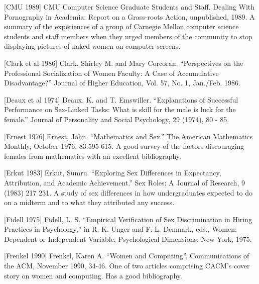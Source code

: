 {\parindent=0pt
\parskip=10pt


[CMU 1989]          CMU Computer Science Graduate Students and Staff. Dealing With Pornography in Academia: Report on a Grass-roots Action, unpublished, 1989. A summary of the experiences of a group of
                    Carnegie Mellon computer science students and staff members when they urged
                    members of the community to stop displaying pictures of naked women on computer screens.

[Clark et al 1986]  Clark, Shirley M. and Mary Corcoran.
                    ``Perspectives on the Professional Socialization of Women Faculty: A Case
                    of Accumulative Disadvantage?'' Journal of Higher Education, Vol. 57, No. 1,
                    Jan./Feb. 1986.


[Deaux et al 1974]  Deaux, K. and T. Emswiller. ``Explanations of Successful Performance on
                    Sex-Linked Tasks: What is skill for the
                    male is luck for the female.'' Journal of
                    Personality and Social Psychology, 29
                    (1974), 80 - 85.


[Ernest 1976]       Ernest, John. ``Mathematics and Sex.''
                    The American Mathematics Monthly,
                    October 1976, 83:595-615. A good survey of the factors discouraging females
                    from mathematics with an excellent bibliography.

[Erkut 1983]        Erkut, Sumru. ``Exploring Sex Differences in Expectancy, Attribution, and
                    Academic Achievement.'' Sex Roles: A
                    Journal of Research, 9 (1983) 217 231. A study of sex differences in how undergraduates expected to do on a midterm
                    and to what they attributed any success.


[Fidell 1975]       Fidell, L. S. ``Empirical Verification of
                    Sex Discrimination in Hiring Practices
                    in Psychology,'' in R. K. Unger and
                    F. L. Denmark, eds., Women: Dependent or Independent Variable, Psychological Dimensions: New York, 1975.



[Frenkel 1990]      Frenkel, Karen A. ``Women and Computing''. Communications of the ACM,
                    November 1990, 34-46. One of two articles comprising CACM's cover story on
                    women and computing. Has a good bibliography.




}

